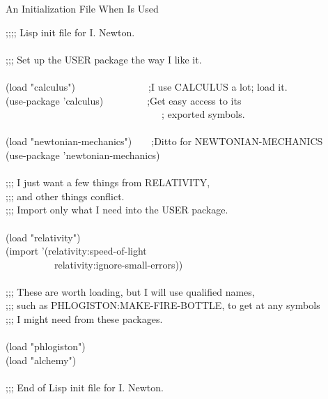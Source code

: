 {\newpage
\clearpage
\samepage \begin{table}%
[t]
\caption{An Initialization File When \protect{} Is Used}
\label{DEFPACKAGE-INIT-FILE-TABLE}
\begin{lisp}
;;;; Lisp init file for I. Newton. \\ 
 \\ 
;;; Set up the USER package the way I like it. \\ 
 \\ 
(load "calculus")~~~~~~~~~~~~~~~;I use CALCULUS a lot; load it. \\ 
(use-package 'calculus)~~~~~~~~~;Get easy access to its \\ 
~~~~~~~~~~~~~~~~~~~~~~~~~~~~~~~~; exported symbols. \\ 
 \\ 
(load "newtonian-mechanics")~~~~;Ditto for NEWTONIAN-MECHANICS \\ 
(use-package 'newtonian-mechanics) \\ 
 \\ 
;;; I just want a few things from RELATIVITY, \\ 
;;; and other things conflict. \\ 
;;; Import only what I need into the USER package. \\ 
 \\ 
(load "relativity") \\ 
(import '(relativity:speed-of-light \\ 
~~~~~~~~~~relativity:ignore-small-errors)) \\ 
 \\ 
;;; These are worth loading, but I will use qualified names, \\ 
;;; such as PHLOGISTON:MAKE-FIRE-BOTTLE, to get at any symbols \\ 
;;; I might need from these packages. \\ 
 \\ 
(load "phlogiston") \\ 
(load "alchemy") \\ 
 \\ 
;;; End of Lisp init file for I. Newton.
\end{lisp}
\end{table}
}

